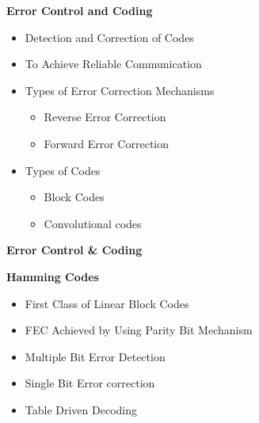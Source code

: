 \documentclass{beamer}
\begin{document}
\begin{frame}{\scriptsize \LARGE \textbf{Error Control and Coding}}
			
				\begin{itemize}
					\pause 
					\item Detection and Correction of Codes
					\pause
					\item To Achieve Reliable Communication
					\pause 
					\item Types of Error Correction Mechanisms
					\begin{itemize}
					\pause
					\item Reverse Error Correction  
					\pause
					\item Forward Error Correction
					\end{itemize}
					\pause
					\item Types of Codes
					\begin{itemize}
					\pause
					\item Block Codes 
					\pause
					\item Convolutional codes
					\end{itemize}
					\end{itemize}
		\end{frame}


\begin{frame}{\scriptsize \LARGE \centering \textbf{Error Control \& Coding}}
	\begin{block}{\textbf{Hamming Codes}}
		\begin{itemize}
		\pause
			\item First Class of Linear Block Codes 
			\pause
			\item FEC Achieved by Using Parity Bit Mechanism
			\pause
			\item Multiple Bit Error Detection 
			\pause
			\item Single Bit Error correction
			\pause
			\item Table Driven Decoding
		\end{itemize}
	\end{block}
\end{frame}
\end{document}
